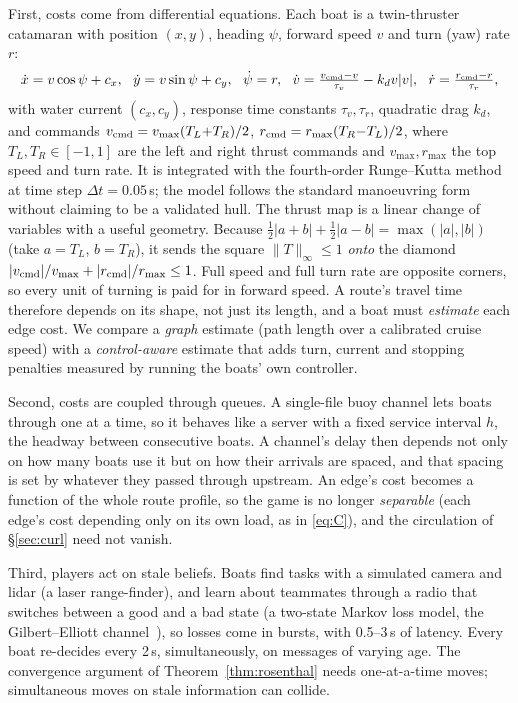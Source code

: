 \documentclass[11pt]{article}
\theoremstyle{definition}
\begin{document}
First, costs come from differential equations. Each boat is a twin-thruster catamaran with position $(x,y)$, heading $\psi$, forward speed $v$ and turn (yaw) rate $r$:
\begin{equation}
\dot x=v\cos\psi+c_x,\ \ \dot y=v\sin\psi+c_y,\ \ \dot\psi=r,\ \ \dot v=\tfrac{v_{\rm cmd}-v}{\tau_v}-k_d v|v|,\ \ \dot r=\tfrac{r_{\rm cmd}-r}{\tau_r},
\label{eq:boat}
\end{equation}
with water current $(c_x,c_y)$, response time constants $\tau_v,\tau_r$, quadratic drag $k_d$, and commands $v_{\rm cmd}=v_{\max}(T_L{+}T_R)/2$, $r_{\rm cmd}=r_{\max}(T_R{-}T_L)/2$, where $T_L,T_R\in[-1,1]$ are the left and right thrust commands and $v_{\max},r_{\max}$ the top speed and turn rate. It is integrated with the fourth-order Runge--Kutta method at time step $\Delta t=0.05$\,s; the model follows the standard manoeuvring form~\cite{fossen2011} without claiming to be a validated hull. The thrust map is a linear change of variables with a useful geometry. Because $\tfrac12|a+b|+\tfrac12|a-b|=\max(|a|,|b|)$ (take $a=T_L$, $b=T_R$), it sends the square $\|T\|_\infty\le1$ \emph{onto} the diamond $|v_{\rm cmd}|/v_{\max}+|r_{\rm cmd}|/r_{\max}\le1$. Full speed and full turn rate are opposite corners, so every unit of turning is paid for in forward speed. A route's travel time therefore depends on its shape, not just its length, and a boat must \emph{estimate} each edge cost. We compare a \emph{graph} estimate (path length over a calibrated cruise speed) with a \emph{control-aware} estimate that adds turn, current and stopping penalties measured by running the boats' own controller.

Second, costs are coupled through queues. A single-file buoy channel lets boats through one at a time, so it behaves like a server with a fixed service interval $h$, the headway between consecutive boats. A channel's delay then depends not only on how many boats use it but on how their arrivals are spaced, and that spacing is set by whatever they passed through upstream. An edge's cost becomes a function of the whole route profile, so the game is no longer \emph{separable} (each edge's cost depending only on its own load, as in \eqref{eq:C}), and the circulation of \S\ref{sec:curl} need not vanish.

Third, players act on stale beliefs. Boats find tasks with a simulated camera and lidar (a laser range-finder), and learn about teammates through a radio that switches between a good and a bad state (a two-state Markov loss model, the Gilbert--Elliott channel~\cite{gilbert1960,elliott1963}), so losses come in bursts, with 0.5--3\,s of latency. Every boat re-decides every 2\,s, simultaneously, on messages of varying age. The convergence argument of Theorem~\ref{thm:rosenthal} needs one-at-a-time moves; simultaneous moves on stale information can collide.
\end{document}
